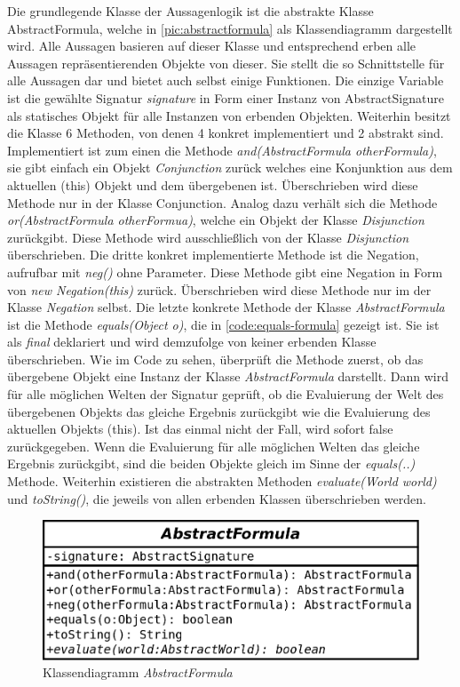 \documentclass[12pt,a4paper]{article}
\begin{document}
Die grundlegende Klasse der Aussagenlogik ist die abstrakte Klasse AbstractFormula, welche in \autoref{pic:abstractformula} als Klassendiagramm dargestellt wird. Alle Aussagen basieren auf dieser Klasse und entsprechend erben alle Aussagen repräsentierenden Objekte von dieser. Sie stellt die so Schnittstelle für alle Aussagen dar und bietet auch selbst einige Funktionen. Die einzige Variable ist die gewählte Signatur \textit{signature} in Form einer Instanz von AbstractSignature als statisches Objekt für alle Instanzen von erbenden Objekten. Weiterhin besitzt die Klasse 6 Methoden, von denen 4 konkret implementiert und 2 abstrakt sind. Implementiert ist zum einen die Methode \textit{and(AbstractFormula otherFormula)}, sie gibt einfach ein Objekt \textit{Conjunction} zurück welches eine Konjunktion aus dem aktuellen (this) Objekt und dem übergebenen ist. Überschrieben wird diese Methode nur in der Klasse Conjunction. Analog dazu verhält sich die Methode \textit{or(AbstractFormula otherFormua)}, welche ein Objekt der Klasse \textit{Disjunction} zurückgibt. Diese Methode wird ausschließlich von der Klasse \textit{Disjunction} überschrieben. Die dritte konkret implementierte Methode ist die Negation, aufrufbar mit \textit{neg()} ohne Parameter. Diese Methode gibt eine Negation in Form von \textit{new Negation(this)} zurück. Überschrieben wird diese Methode nur im der Klasse \textit{Negation} selbst. Die letzte konkrete Methode der Klasse \textit{AbstractFormula} ist die Methode \textit{equals(Object o)}, die in \autoref{code:equals-formula} gezeigt ist. Sie ist als \textit{final} deklariert und wird demzufolge von keiner erbenden Klasse überschrieben. Wie im Code zu sehen, überprüft die Methode zuerst, ob das übergebene Objekt eine Instanz der Klasse \textit{AbstractFormula} darstellt. Dann wird für alle möglichen Welten der Signatur geprüft, ob die Evaluierung der Welt des übergebenen Objekts das gleiche Ergebnis zurückgibt wie die Evaluierung des aktuellen Objekts (this). Ist das einmal nicht der Fall, wird sofort false zurückgegeben. Wenn die Evaluierung für alle möglichen Welten das gleiche Ergebnis zurückgibt, sind die beiden Objekte gleich im Sinne der \textit{equals(..)} Methode. Weiterhin existieren die abstrakten Methoden \textit{evaluate(World world)} und \textit{toString()}, die jeweils von allen erbenden Klassen überschrieben werden.


\begin{figure}
\includegraphics[width=0.55\linewidth]{bilder/AbstractFormula.png}
\caption{Klassendiagramm \textit{AbstractFormula}}
\label{pic:abstractformula}
\end{figure}
\end{document}
